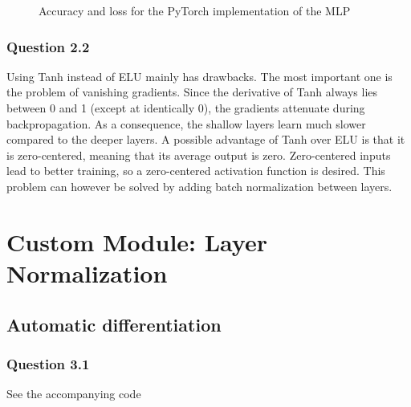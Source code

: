 \documentclass{article}
\begin{document}
\begin{figure}[H]
	\centering
	\caption{Accuracy and loss for the PyTorch implementation of the MLP}
	\label{fig:torchcurves}
\end{figure}
\subsubsection*{Question 2.2}
Using Tanh instead of ELU mainly has drawbacks. The most important one is the problem of vanishing gradients. Since the derivative of Tanh always lies between 0 and 1 (except at identically 0), the gradients attenuate during backpropagation. As a consequence, the shallow layers learn much slower compared to the deeper layers. A possible advantage of Tanh over ELU is that it is zero-centered, meaning that its average output is zero. Zero-centered inputs lead to better training, so a zero-centered activation function is desired. This problem can however be solved by adding batch normalization between layers.
\section{Custom Module: Layer Normalization}
\subsection{Automatic differentiation}
\subsubsection*{Question 3.1}
See the accompanying code
\end{document}
